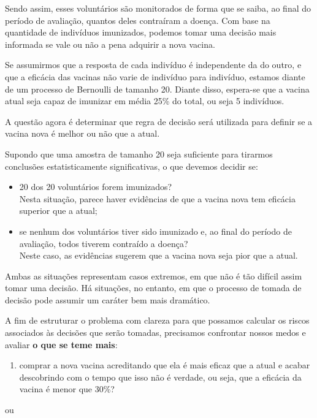\documentclass[
]{book}
\providecommand{\tightlist}{%
  \setlength{\itemsep}{0pt}\setlength{\parskip}{0pt}}
\theoremstyle{definition}
\theoremstyle{definition}
\theoremstyle{definition}
\theoremstyle{remark}
\begin{document}
Sendo assim, esses voluntários são monitorados de forma que se saiba, ao final do período de avaliação, quantos deles contraíram a doença. Com base na quantidade de indivíduos imunizados, podemos tomar uma decisão mais informada se vale ou não a pena adquirir a nova vacina.

Se assumirmos que a resposta de cada indivíduo é independente da do outro, e que a eficácia das vacinas não varie de indivíduo para indivíduo, estamos diante de um processo de Bernoulli de tamanho 20. Diante disso, espera-se que a vacina atual seja capaz de imunizar em média 25\% do total, ou seja 5 indivíduos.

A questão agora é determinar que regra de decisão será utilizada para definir se a vacina nova é melhor ou não que a atual.

Supondo que uma amostra de tamanho 20 seja suficiente para tirarmos conclusões estatisticamente significativas, o que devemos decidir se:

\begin{itemize}
\tightlist
\item
  20 dos 20 voluntários forem imunizados?\\
  Nesta situação, parece haver evidências de que a vacina nova tem eficácia superior que a atual;
\item
  se nenhum dos voluntários tiver sido imunizado e, ao final do período de avaliação, todos tiverem contraído a doença?\\
  Neste caso, as evidências sugerem que a vacina nova seja pior que a atual.
\end{itemize}

Ambas as situações representam casos extremos, em que não é tão difícil assim tomar uma decisão. Há situações, no entanto, em que o processo de tomada de decisão pode assumir um caráter bem mais dramático.

A fim de estruturar o problema com clareza para que possamos calcular os riscos associados às decisões que serão tomadas, precisamos confrontar nossos medos e avaliar \textbf{o que se teme mais}:

\begin{enumerate}
\def\labelenumi{(\arabic{enumi})}
\tightlist
\item
  comprar a nova vacina acreditando que ela é mais eficaz que a atual e acabar descobrindo com o tempo que isso não é verdade, ou seja, que a eficácia da vacina é menor que 30\%?
\end{enumerate}

ou
\end{document}
